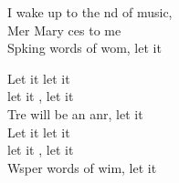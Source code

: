 \begin{cancion}
	I wake up to the nd of music, \\
	Mer Mary ces to me\\
	Spking words of wom, let it   \jump\\
	\begin{chorus}%
		Let it  let it  \\
		let it , let it  \\
		Tre will be an anr, let it  \\
	\jump
		Let it  let it  \\
		let it , let it  \\
		Wsper words of wim, let it  \jump\\
	\end{chorus}%
\end{cancion}%
